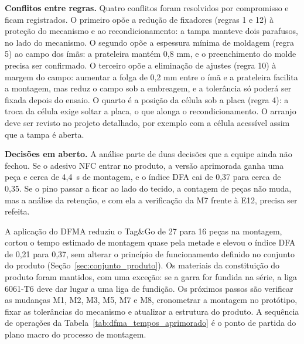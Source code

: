 \textbf{Conflitos entre regras.} Quatro conflitos foram resolvidos por compromisso e ficam registrados. O primeiro opõe a redução de fixadores (regras 1 e 12) à proteção do mecanismo e ao recondicionamento: a tampa manteve dois parafusos, no lado do mecanismo. O segundo opõe a espessura mínima de moldagem (regra 5) ao campo dos ímãs: a prateleira mantém 0,8 mm, e o preenchimento do molde precisa ser confirmado. O terceiro opõe a eliminação de ajustes (regra 10) à margem do campo: aumentar a folga de 0,2 mm entre o ímã e a prateleira facilita a montagem, mas reduz o campo sob a embreagem, e a tolerância só poderá ser fixada depois do ensaio. O quarto é a posição da célula sob a placa (regra 4): a troca da célula exige soltar a placa, o que alonga o recondicionamento. O arranjo deve ser revisto no projeto detalhado, por exemplo com a célula acessível assim que a tampa é aberta.

\textbf{Decisões em aberto.} A análise parte de duas decisões que a equipe ainda não fechou. Se o adesivo NFC entrar no produto, a versão aprimorada ganha uma peça e cerca de 4,4~s de montagem, e o índice DFA cai de 0,37 para cerca de 0,35. Se o pino passar a ficar ao lado do tecido, a contagem de peças não muda, mas a análise da retenção, e com ela a verificação da M7 frente à E12, precisa ser refeita.

A aplicação do DFMA reduziu o Tag\&Go de 27 para 16 peças na montagem, cortou o tempo estimado de montagem quase pela metade e elevou o índice DFA de 0,21 para 0,37, sem alterar o princípio de funcionamento definido no conjunto do produto (Seção~\ref{sec:conjunto_produto}). Os materiais da constituição do produto foram mantidos, com uma exceção: se a garra for fundida na série, a liga 6061-T6 deve dar lugar a uma liga de fundição. Os próximos passos são verificar as mudanças M1, M2, M3, M5, M7 e M8, cronometrar a montagem no protótipo, fixar as tolerâncias do mecanismo e atualizar a estrutura do produto. A sequência de operações da Tabela~\ref{tab:dfma_tempos_aprimorado} é o ponto de partida do plano macro do processo de montagem.
